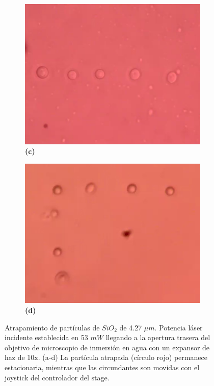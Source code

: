 \documentclass[10pt,aspectratio=1610,compress,dvipsnames]{beamer}
\begin{document}
\begin{frame}
{\begin{figure}
  \begin{subfigure}[b]{0.2\linewidth}
    \includegraphics[width=\linewidth]{particlesnow.png} %
    \caption*{\textbf{(c)}}
    \label{fig7:c}
  \end{subfigure}\hspace{0.5cm} %
  \begin{subfigure}[b]{0.2\linewidth}
    \includegraphics[width=\linewidth]{Particles3.png} %
    \caption*{\textbf{(d)}}
    \label{fig7:d}
  \end{subfigure}
  \caption{
Atrapamiento de partículas de $SiO_2$ de 4.27 $\mu m$. Potencia láser incidente establecida en 53 $mW$ llegando a la apertura trasera del objetivo de microscopio de inmersión en agua con un expansor de haz de 10x. (a-d) La partícula atrapada (círculo rojo) permanece estacionaria, mientras que las circundantes son movidas con el joystick del controlador del stage.}
  \label{poresfrustrules}
\end{figure}


}
\end{frame}
\end{document}

